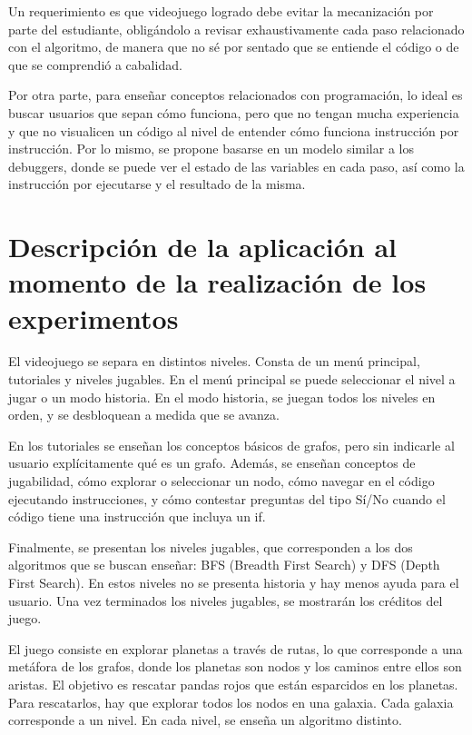 Un requerimiento es que videojuego logrado debe evitar la mecanización por parte del estudiante, obligándolo a revisar exhaustivamente cada paso relacionado con el algoritmo, de manera que no sé por sentado que se entiende el código o de que se comprendió a cabalidad.

Por otra parte, para enseñar conceptos relacionados con programación, lo ideal es buscar usuarios que sepan cómo funciona, pero que no tengan mucha experiencia y que no visualicen un código al nivel de entender cómo funciona instrucción por instrucción. Por lo mismo, se propone basarse en un modelo similar a los debuggers, donde se puede ver el estado de las variables en cada paso, así como la instrucción por ejecutarse y el resultado de la misma.



\section{Descripción de la aplicación al momento de la realización de los experimentos}

El videojuego se separa en distintos niveles. Consta de un menú principal, tutoriales y niveles jugables. 
En el menú principal se puede seleccionar el nivel a jugar o un modo historia. En el modo historia, se juegan todos los 
niveles en orden, y se desbloquean a medida que se avanza.

En los tutoriales se enseñan los conceptos básicos de grafos, pero sin indicarle al usuario explícitamente qué es un grafo. 
Además, se enseñan conceptos de jugabilidad, cómo explorar o seleccionar un nodo, cómo navegar en el código ejecutando instrucciones, y cómo contestar preguntas del tipo Sí/No cuando el código tiene una instrucción que incluya un if.

Finalmente, se presentan los niveles jugables, que corresponden a los dos algoritmos que se buscan enseñar: BFS (Breadth First Search) y DFS (Depth First Search). En estos niveles no se presenta historia y hay menos ayuda para el usuario. Una vez terminados los niveles jugables, se mostrarán los créditos del juego.


El juego consiste en explorar planetas a través de rutas, lo que corresponde a una metáfora de los grafos, donde los planetas son nodos y los caminos entre ellos son aristas. El objetivo es rescatar pandas rojos que están esparcidos en los planetas. Para rescatarlos, hay que explorar todos los nodos en una galaxia. Cada galaxia corresponde a un nivel. En cada nivel, se enseña un algoritmo distinto. 

